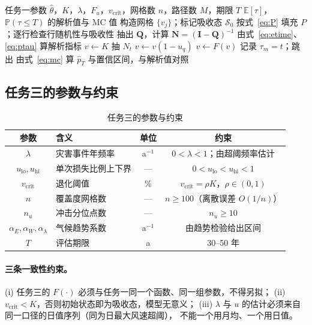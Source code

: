 \documentclass[11pt,a4paper]{ctexart}
\newcommand{\E}{\mathbb{E}}
\newcommand{\Prob}{\mathbb{P}}
\begin{document}
\begin{algorithm}[H]
\caption{任务三：吸收链指标与蒙特卡洛校验}\label{alg:mc}
\begin{algorithmic}[1]
\Require 任务一参数 $\hat\theta$，$K$，$\lambda$，$F_u$，$v_{\mathrm{crit}}$，网格数 $n$，路径数 $M$，期限 $T$
\Ensure $\E[\tau]$，$\Prob(\tau\le T)$ 的解析值与 MC 值
\State 构造网格 $\{v_j\}$；标记吸收态 $\mathcal{S}_0$
\State 按式~\eqref{eq:P} 填充 $P$；逐行检查行随机性与吸收性
\State 抽出 $\bm{Q}$，计算 $\bm{N}=(\bm{I}-\bm{Q})^{-1}$
\State 由式~\eqref{eq:etime}、\eqref{eq:ptau} 算解析指标
  \State $v\gets K$
    \State 抽 $N_t$
      \State $v\gets v(1-u_q)$
    \EndFor
    \State $v\gets F(v)$
      \State 记录 $\tau_m=t$；跳出
    \EndIf
  \EndFor
\EndFor
\State 由式~\eqref{eq:mc} 算 $\hat p_T$ 与置信区间，与解析值对照
\end{algorithmic}
\end{algorithm}

\subsection{任务三的参数与约束}

\begin{table}[H]\centering\small
\begin{tabularx}{\textwidth}{|c|X|c|c|}
\toprule
参数 & 含义 & 单位 & 约束 \\
\midrule
$\lambda$ & 灾害事件年频率 & a$^{-1}$ & $0<\lambda<1$；由超阈频率估计 \\
$u_{\mathrm{lo}},u_{\mathrm{hi}}$ & 单次损失比例上下界 & — & $0<u_{\mathrm{lo}}<u_{\mathrm{hi}}<1$ \\
$v_{\mathrm{crit}}$ & 退化阈值 & \% & $v_{\mathrm{crit}}=\rho K$，$\rho\in(0,1)$ \\
$n$ & 覆盖度网格数 & — & $n\ge100$（离散误差 $O(1/n)$） \\
$n_u$ & 冲击分位点数 & — & $n_u\ge10$ \\
$\alpha_E,\alpha_W,\alpha_\lambda$ & 气候趋势系数 & a$^{-1}$ & 由趋势检验给出区间 \\
$T$ & 评估期限 & a & 30--50 年 \\
\bottomrule
\end{tabularx}
\caption{任务三的参数与约束}\label{tab:t3par}
\end{table}

\paragraph{三条一致性约束。}
(i) 任务三的 $F(\cdot)$ 必须与任务一同一个函数、同一组参数，不得另拟；
(ii) $v_{\mathrm{crit}}<K$，否则初始状态即为吸收态，模型无意义；
(iii) $\lambda$ 与 $u$ 的估计必须来自同一口径的日值序列（同为日最大风速超阈），
不能一个用月均、一个用日值。
\end{document}
